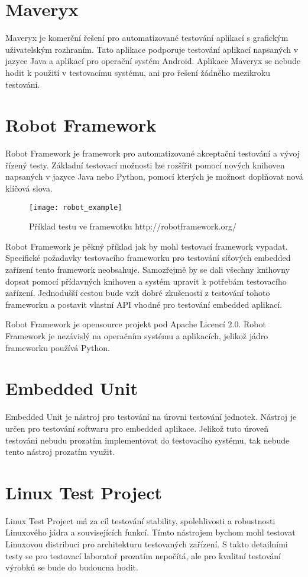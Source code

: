 \section{Maveryx}
Maveryx je komerční řešení pro automatizované testování aplikací s grafickým uživatelským rozhraním. Tato aplikace podporuje testování aplikací napsaných v jazyce Java a aplikací pro operační systém Android. Aplikace Maveryx se nebude hodit k použití v testovacímu systému, ani pro řešení žádného mezikroku testování.

\section{Robot Framework}
Robot Framework je framework pro automatizované akceptační testování a vývoj řízený testy. Základní testovací možnosti lze rozšířit pomocí nových knihoven napsaných v jazyce Java nebo Python, pomocí kterých je možnost doplňovat nová klíčová slova.

\begin{figure}[h]
  \centering
  \texttt{[image: robot\_example]}
  \caption{Příklad testu ve framewotku http://robotframework.org/}
  \label{fig:robot_example}
\end{figure}

Robot Framework je pěkný příklad jak by mohl testovací framework vypadat. Specifické požadavky testovacího frameworku pro testování síťových embedded zařízení tento framework neobsahuje. Samozřejmě by se dali všechny knihovny dopsat pomocí přídavných knihoven a systém upravit k potřebám testovacího zařízení. Jednodušší cestou bude vzít dobré zkušenosti z testování tohoto frameworku a postavit vlastní API vhodné pro testování embedded aplikací.

Robot Framework je opensource projekt pod Apache Licencí 2.0. Robot Framework je nezávislý na operačním systému a aplikacích, jelikož jádro frameworku používá Python.

\section{Embedded Unit}
Embedded Unit je nástroj pro testování na úrovni testování jednotek. Nástroj je určen pro testování softwaru pro embedded aplikace. Jelikož tuto úroveň testování nebudu prozatím implementovat do testovacího systému, tak nebude tento nástroj prozatím využit.

\section{Linux Test Project}
Linux Test Project má za cíl testování stability, spolehlivosti a robustnosti Linuxového jádra a souvisejících funkcí. Tímto nástrojem bychom mohl testovat Linuxovou distribuci pro architekturu testovaných zařízení. S takto detailními testy se pro testovací laboratoř prozatím nepočítá, ale pro kvalitní testování výrobků se bude do budoucna hodit.


